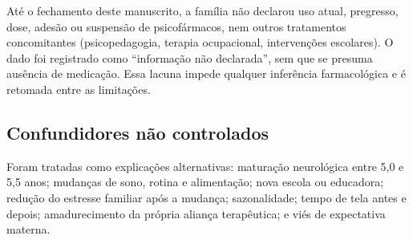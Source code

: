 At\'e o fechamento deste manuscrito, a fam\'ilia n\~ao declarou uso atual, pregresso, dose, ades\~ao ou suspens\~ao de psicof\'armacos, nem outros tratamentos concomitantes (psicopedagogia, terapia ocupacional, interven\c{c}\~oes escolares). O dado foi registrado como ``informa\c{c}\~ao n\~ao declarada'', sem que se presuma aus\^encia de medica\c{c}\~ao. Essa lacuna impede qualquer infer\^encia farmacol\'ogica e \'e retomada entre as limita\c{c}\~oes.

\subsection{Confundidores n\~ao controlados}

Foram tratadas como explica\c{c}\~oes alternativas: matura\c{c}\~ao neurol\'ogica entre 5,0 e 5,5 anos; mudan\c{c}as de sono, rotina e alimenta\c{c}\~ao; nova escola ou educadora; redu\c{c}\~ao do estresse familiar ap\'os a mudan\c{c}a; sazonalidade; tempo de tela antes e depois; amadurecimento da pr\'opria alian\c{c}a terap\^eutica; e vi\'es de expectativa materna.
